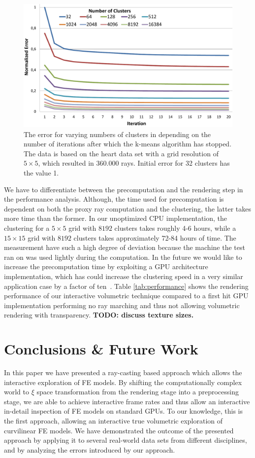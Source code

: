 \documentclass[review,journal]{vgtc}         %
\begin{document}
\begin{figure}[t]
    \centering 
    \includegraphics[width=0.85\linewidth]{figures/diagram_num_clusters}
    \caption{The error for varying numbers of clusters in depending on the number of iterations after which the k-means algorithm has stopped. The data is based on the heart data set with a grid resolution of $5\times5$, which resulted in 360.000 rays. Initial error for 32 clusters has the value 1.}
    \label{fig:clustering_epsilon_error}
\end{figure}

We have to differentiate between the precomputation and the rendering step in the performance analysis. Although, the time used for precomputation is dependent on both the proxy ray computation and the clustering, the latter takes more time than the former. In our unoptimized CPU implementation, the clustering for a $5\times5$ grid with $8192$ clusters takes roughly 4-6 hours, while a $15\times15$ grid with $8192$ clusters takes approximately 72-84 hours of time. The measurement have such a high degree of deviation because the machine the test ran on was used lightly during the computation. In the future we would like to increase the precomputation time by exploiting a GPU architecture implementation, which has could increase the clustering speed in a very similar application case by a factor of ten~\cite{mess10gpuclustering}. Table \ref{tab:performance} shows the rendering performance of our interactive volumetric technique compared to a first hit GPU implementation performing no ray marching and thus not allowing volumetric rendering with transparency. \textbf{TODO: discuss texture sizes.}



\section{Conclusions \& Future Work}\label{sec:conclusions}
In this paper we have presented a ray-casting based approach which allows the interactive exploration of FE models. By shifting the computationally complex world to $\xi$ space transformation from the rendering stage into a preprocessing stage, we are able to achieve interactive frame rates and thus allow an interactive in-detail inspection of FE models on standard GPUs. To our knowledge, this is the first approach, allowing an interactive true volumetric exploration of curvilinear FE models. We have demonstrated the outcome of the presented approach by applying it to several real-world data sets from different disciplines, and by analyzing the errors introduced by our approach.
\end{document}
